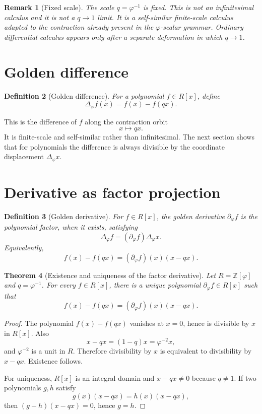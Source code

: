 \documentclass[11pt]{article}
\newtheorem{definition}{Definition}[section]
\newtheorem{theorem}[definition]{Theorem}
\newtheorem{remark}[definition]{Remark}
\newcommand{\ph}{\varphi}
\newcommand{\Z}{\mathbb{Z}}
\newcommand{\dd}{\partial_{\ph}}
\newcommand{\Del}{\Delta_{\ph}}
\begin{document}
\begin{remark}[Fixed scale]
The scale $q=\ph^{-1}$ is fixed.  This is not an infinitesimal calculus and it is not a $q\to1$ limit.  It is a self-similar finite-scale calculus adapted to the contraction already present in the $\ph$-scalar grammar.  Ordinary differential calculus appears only after a separate deformation in which $q\to1$.
\end{remark}

\section{Golden difference}

\begin{definition}[Golden difference]
For a polynomial $f\in R[x]$, define
\[
    \Del f(x)=f(x)-f(qx).
\]
\end{definition}

This is the difference of $f$ along the contraction orbit
\[
    x\mapsto qx.
\]
It is finite-scale and self-similar rather than infinitesimal.  The next section shows that for polynomials the difference is always divisible by the coordinate displacement $\Del x$.

\section{Derivative as factor projection}

\begin{definition}[Golden derivative]
For $f\in R[x]$, the golden derivative $\dd f$ is the polynomial factor, when it exists, satisfying
\[
    \Del f=(\dd f)\Del x.
\]
Equivalently,
\[
    f(x)-f(qx)=(\dd f)(x)(x-qx).
\]
\end{definition}

\begin{theorem}[Existence and uniqueness of the factor derivative]
Let $R=\Z[\ph]$ and $q=\ph^{-1}$.  For every $f\in R[x]$, there is a unique polynomial $\dd f\in R[x]$ such that
\[
    f(x)-f(qx)=(\dd f)(x)(x-qx).
\]
\end{theorem}

\begin{proof}
The polynomial $f(x)-f(qx)$ vanishes at $x=0$, hence is divisible by $x$ in $R[x]$.  Also
\[
    x-qx=(1-q)x=\ph^{-2}x,
\]
and $\ph^{-2}$ is a unit in $R$.  Therefore divisibility by $x$ is equivalent to divisibility by $x-qx$.  Existence follows.

For uniqueness, $R[x]$ is an integral domain and $x-qx\ne0$ because $q\ne1$.  If two polynomials $g,h$ satisfy
\[
    g(x)(x-qx)=h(x)(x-qx),
\]
then $(g-h)(x-qx)=0$, hence $g=h$.
\end{proof}
\end{document}

